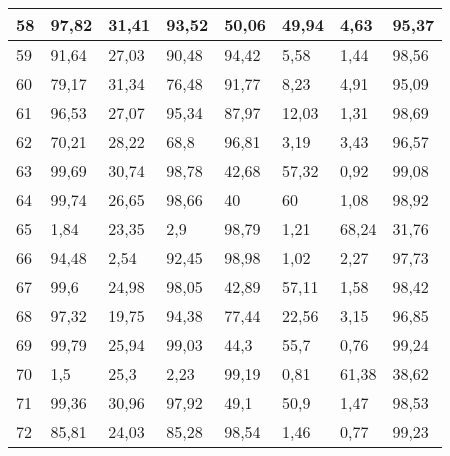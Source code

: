 \begin{longtable}[c]{|l|l|l|l|l|l|l|l|}
58              & 97,82        & 31,41        & 93,52       & 50,06         & 49,94         & 4,63          & 95,37         \\ \hline
59              & 91,64        & 27,03        & 90,48       & 94,42         & 5,58          & 1,44          & 98,56         \\ \hline
60              & 79,17        & 31,34        & 76,48       & 91,77         & 8,23          & 4,91          & 95,09         \\ \hline
61              & 96,53        & 27,07        & 95,34       & 87,97         & 12,03         & 1,31          & 98,69         \\ \hline
62              & 70,21        & 28,22        & 68,8        & 96,81         & 3,19          & 3,43          & 96,57         \\ \hline
63              & 99,69        & 30,74        & 98,78       & 42,68         & 57,32         & 0,92          & 99,08         \\ \hline
64              & 99,74        & 26,65        & 98,66       & 40            & 60            & 1,08          & 98,92         \\ \hline
65              & 1,84         & 23,35        & 2,9         & 98,79         & 1,21          & 68,24         & 31,76         \\ \hline
66              & 94,48        & 2,54         & 92,45       & 98,98         & 1,02          & 2,27          & 97,73         \\ \hline
67              & 99,6         & 24,98        & 98,05       & 42,89         & 57,11         & 1,58          & 98,42         \\ \hline
68              & 97,32        & 19,75        & 94,38       & 77,44         & 22,56         & 3,15          & 96,85         \\ \hline
69              & 99,79        & 25,94        & 99,03       & 44,3          & 55,7          & 0,76          & 99,24         \\ \hline
70              & 1,5          & 25,3         & 2,23        & 99,19         & 0,81          & 61,38         & 38,62         \\ \hline
71              & 99,36        & 30,96        & 97,92       & 49,1          & 50,9          & 1,47          & 98,53         \\ \hline
72              & 85,81        & 24,03        & 85,28       & 98,54         & 1,46          & 0,77          & 99,23         \\ \hline

\end{longtable}
